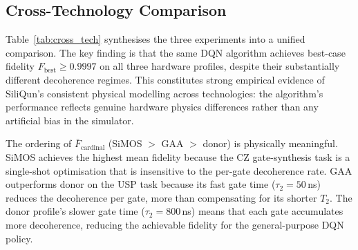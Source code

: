 \subsection{Cross-Technology Comparison}
\label{subsec:cross_tech}

Table~\ref{tab:cross_tech} synthesises the three experiments into a
unified comparison.
The key finding is that the same DQN algorithm achieves best-case fidelity
$F_\text{best} \geq 0.9997$ on all three hardware profiles, despite their
substantially different decoherence regimes.
This constitutes strong empirical evidence of SiliQun's consistent
physical modelling across technologies: the algorithm's performance
reflects genuine hardware physics differences rather than any
artificial bias in the simulator.

\begin{table}[ht]
\centering
\caption{Cross-technology comparison. DQN is applied to all three
  hardware profiles using identical hyperparameters. The variation in
  $\bar{F}_\text{cardinal}$ reflects genuine hardware physics differences
  (coherence time, gate speed, charge noise), not simulator bias.
  All mean values are reported over 5 independent seeds;
  95\% confidence intervals are computed as $\bar{F} \pm 1.96\,\sigma/\sqrt{5}$.}
\label{tab:cross_tech}
\end{table}

The ordering of $\bar{F}_\text{cardinal}$ (SiMOS $>$ GAA $>$ donor) is
physically meaningful.
SiMOS achieves the highest mean fidelity because the CZ gate-synthesis
task is a single-shot optimisation that is insensitive to the per-gate
decoherence rate.
GAA outperforms donor on the USP task because its fast gate time
($\tau_2 = 50$\,ns) reduces the decoherence per gate, more than
compensating for its shorter $T_2$.
The donor profile's slower gate time ($\tau_2 = 800$\,ns) means that
each gate accumulates more decoherence, reducing the achievable fidelity
for the general-purpose DQN policy.

